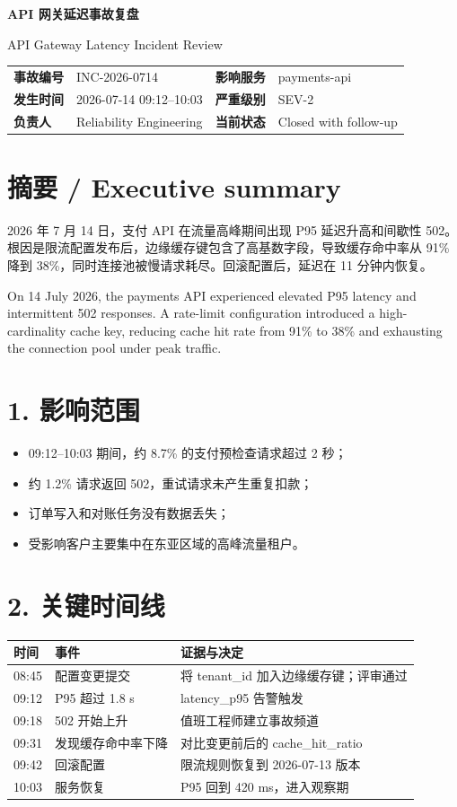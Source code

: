 \documentclass[10pt,a4paper]{article}
\begin{document}
{\color{navy}\fontsize{22}{26}\selectfont\bfseries API 网关延迟事故复盘}\par
{\color{muted}\fontsize{13}{16}\selectfont API Gateway Latency Incident Review}\par\vspace{3mm}{\color{red}\rule{\textwidth}{2pt}}\par\vspace{4mm}
\begin{tabular}{>{\bfseries}p{28mm}p{48mm}>{\bfseries}p{28mm}p{48mm}}
事故编号 & INC-2026-0714 & 影响服务 & payments-api\\
发生时间 & 2026-07-14 09:12--10:03 & 严重级别 & SEV-2\\
负责人 & Reliability Engineering & 当前状态 & Closed with follow-up\\
\end{tabular}
\section*{摘要 / Executive summary}
2026 年 7 月 14 日，支付 API 在流量高峰期间出现 P95 延迟升高和间歇性 502。根因是限流配置发布后，边缘缓存键包含了高基数字段，导致缓存命中率从 91\% 降到 38\%，同时连接池被慢请求耗尽。回滚配置后，延迟在 11 分钟内恢复。

On 14 July 2026, the payments API experienced elevated P95 latency and intermittent 502 responses. A rate-limit configuration introduced a high-cardinality cache key, reducing cache hit rate from 91\% to 38\% and exhausting the connection pool under peak traffic.
\section*{1. 影响范围}
\begin{itemize}
\item 09:12--10:03 期间，约 8.7\% 的支付预检查请求超过 2 秒；
\item 约 1.2\% 请求返回 502，重试请求未产生重复扣款；
\item 订单写入和对账任务没有数据丢失；
\item 受影响客户主要集中在东亚区域的高峰流量租户。
\end{itemize}
\section*{2. 关键时间线}
\begin{longtable}{p{27mm}p{45mm}p{83mm}}
\toprule 时间 & 事件 & 证据与决定\\\midrule
08:45 & 配置变更提交 & 将 tenant\_id 加入边缘缓存键；评审通过\\
09:12 & P95 超过 1.8 s & latency\_p95 告警触发\\
09:18 & 502 开始上升 & 值班工程师建立事故频道\\
09:31 & 发现缓存命中率下降 & 对比变更前后的 cache\_hit\_ratio\\
09:42 & 回滚配置 & 限流规则恢复到 2026-07-13 版本\\
10:03 & 服务恢复 & P95 回到 420 ms，进入观察期\\
\bottomrule
\end{longtable}
\newpage
\end{document}
